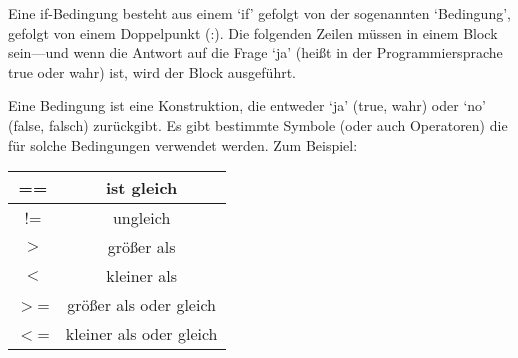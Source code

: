Eine if-Bedingung besteht aus einem `if' gefolgt von der sogenannten `Bedingung', gefolgt von einem Doppelpunkt (:). Die folgenden Zeilen müssen in einem Block sein---und wenn die Antwort auf die Frage `ja' (heißt in der Programmiersprache true oder wahr) ist, wird der Block ausgeführt.
\par
Eine Bedingung  ist eine Konstruktion, die entweder `ja' (true, wahr) oder `no' (false, falsch) zurückgibt. Es gibt bestimmte Symbole (oder auch Operatoren) die für solche Bedingungen verwendet werden. Zum Beispiel:

\begin{center}
\begin{tabular}{|c|c|}
\hline
== & ist gleich \\
\hline
!= & ungleich \\
\hline
$>$ & größer als \\
\hline
$<$ & kleiner als \\
\hline
$>$= & größer als oder gleich \\
\hline
$<$= & kleiner als oder gleich \\
\hline
\end{tabular}
\end{center}

